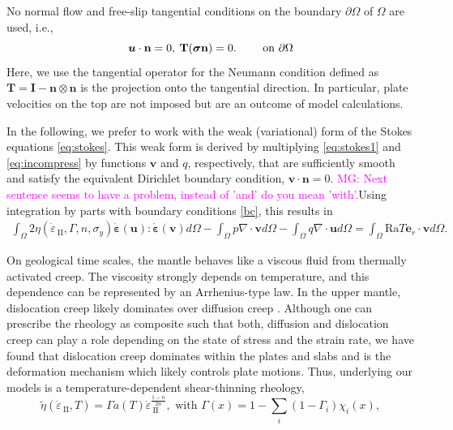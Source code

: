 \documentclass[12pt]{article}
\newcommand{\mgnote}[1]{\textcolor{magenta}{MG: #1}}
\newcommand{\gsnote}[1]{\textcolor{blue}{GS: #1}}
\newcommand{\vrnote}[1]{\textcolor{red}{VR: #1}}
\newcommand{\IIinv}{{\dot\varepsilon}_{\mathrm{\!\!\:II}}}
\newcommand{\uu}{{\ensuremath{\boldsymbol{u}}}}
\newcommand{\vv}{{\ensuremath{\boldsymbol{v}}}}
\newcommand{\ssigma}{{\ensuremath{\boldsymbol{\sigma}}}}
\newcommand{\strain}{{\ensuremath{\dot{\boldsymbol{\varepsilon}}}}}
\begin{document}
%
No normal flow and free-slip tangential conditions on the boundary $\partial\Omega$ of $\Omega$ are
used, i.e., 
\begin{equation}
    \uu \cdot \textbf{n} = 0, \:
    \textbf{T}(\ssigma \textbf{n})=0. %
  \qquad\text{ on }\partial \Omega  \\
  \label{bc}
\end{equation}
Here, we use the tangential operator for the Neumann condition
defined as $\textbf{T}=\textbf{I}-\textbf{n}\otimes\textbf{n}$ is the
projection onto the tangential direction. In particular,  
plate velocities on the top are not imposed but are an outcome of
model calculations.

In the following, we prefer to work with the weak (variational) form
of the Stokes equations \eqref{eq:stokes}.  This weak form is derived
by multiplying \eqref{eq:stokes1} and \eqref{eq:incompress} by
functions $\vv$ and $q$, respectively, that are 
sufficiently smooth and satisfy the equivalent Dirichlet boundary
condition, $\vv\cdot\textbf{n}=0$.
\mgnote{Next sentence seems to have a problem, instead of 'and' do you mean 'with'.}Using integration by parts with boundary conditions
\eqref{bc}, this results in
\begin{multline}
\label{eq:weakStokes}
\!\!\int_{\Omega}
  \!2\eta(\IIinv,\Gamma, n, \sigma_y)\strain(\uu):\strain(\vv)d\Omega
  -\int_{\Omega} p\nabla \cdot \vv d\Omega - \int_{\Omega} q \nabla \cdot
  \uu d\Omega = \int_{\Omega}\text{Ra}T \textbf{e}_r \cdot \vv d\Omega.
\end{multline}

On geological time scales, the mantle behaves like a viscous fluid
from thermally activated creep. The viscosity strongly depends on
temperature, and this dependence can be represented by an Arrhenius-type law. In the
upper mantle, dislocation creep likely dominates over diffusion
creep \citep{stocker1973rheology}. Although one can prescribe the rheology as composite
\citep{GGGE1076,Stadler27082010} such that both, diffusion and
dislocation creep can play a
role depending on the state of stress and the strain rate, we have found
that dislocation creep dominates within the plates and slabs and
is the deformation mechanism which likely controls plate motions. Thus,
underlying our models is a temperature-dependent shear-thinning
rheology,
\begin{equation*}
  \tilde\eta(\IIinv,T)=\Gamma a(T)\IIinv^{\frac{1-n}{2n}}, \text{ with }
  \Gamma(x) = 1 - \sum_i(1 - \Gamma_i)\chi_i(x),
\end{equation*}
\end{document}
